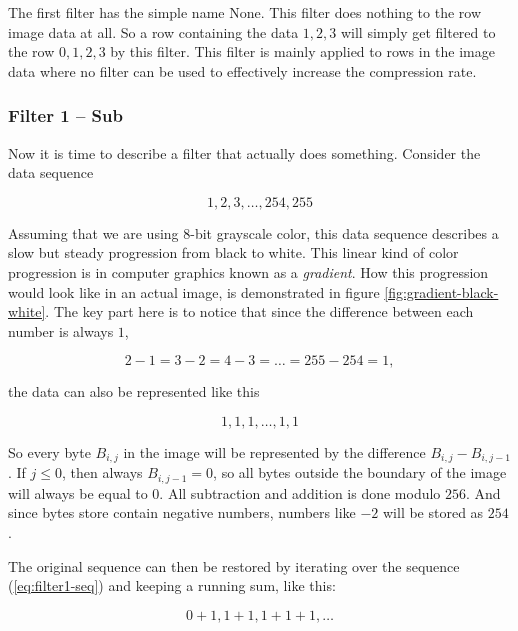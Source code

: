 The first filter has the simple name None. This filter does nothing to
the row image data at all. So a row containing the data $1,2,3$ will
simply get filtered to the row $0,1,2,3$ by this filter. This filter
is mainly applied to rows in the image data where no filter can be
used to effectively increase the compression rate.

\subsubsection{Filter 1 -- Sub}

Now it is time to describe a filter that actually does
something. Consider the data sequence

\begin{equation}
  \label{eq:1-seq}
  1,2,3,\dots,254,255
\end{equation}

Assuming that we are using 8-bit grayscale color, this data sequence
describes a slow but steady progression from black to white. This
linear kind of color progression is in computer graphics known as a
\textit{gradient}\cite{sayood2003lossless}. How this progression would
look like in an actual image, is demonstrated in figure
\ref{fig:gradient-black-white}. The key part here is to notice that
since the difference between each number is always $1$,

\begin{equation*}
  2-1=3-2=4-3=\dots=255-254=1,
\end{equation*}

the data can also be represented
like this

\begin{equation}
  \label{eq:filter1-seq}
  1,1,1,\dots,1,1
\end{equation}

So every byte $B_{i,j}$ in the image will be represented by the
difference $B_{i,j} - B_{i,j-1}$. If $j \le 0$, then always $B_{i,j-1}
= 0$, so all bytes outside the boundary of the image will always be
equal to $0$. All subtraction and addition is done modulo $256$. And
since bytes store contain negative numbers, numbers like $-2$ will be stored as
$254$.

The original sequence can then be restored by iterating over the
sequence (\ref{eq:filter1-seq}) and keeping a running sum, like this:

\begin{equation*}
  0+1,1+1,1+1+1,\dots
\end{equation*}

